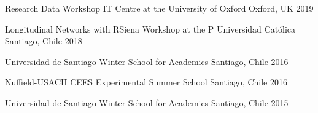 






\begin{cvhonors}
\cvconf
{Research Data Workshop IT Centre at the University of Oxford} 
{Oxford, UK}
{2019}
\end{cvhonors}

\vspace{1mm}

\begin{cvhonors}
\cvconf
{Longitudinal Networks with RSiena Workshop at the P Universidad Cat\'olica}
{Santiago, Chile}
{2018}
\end{cvhonors}

\vspace{1mm}

\begin{cvhonors}
\cvconf
{Universidad de Santiago Winter School for Academics}
{Santiago, Chile}
{2016}
\end{cvhonors}

\vspace{1mm}

\begin{cvhonors}
\cvconf
{Nuffield-USACH CEES Experimental Summer School}
{Santiago, Chile}
{2016}
\end{cvhonors}

\vspace{1mm}

\begin{cvhonors}
\cvconf
{Universidad de Santiago Winter School for Academics}
{Santiago, Chile}
{2015}
\end{cvhonors}

